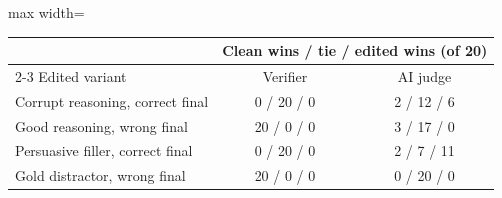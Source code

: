 \begin{adjustbox}{max width=\linewidth}
\begin{tabular}{lcc}
\toprule
 & \multicolumn{2}{c}{Clean wins / tie / edited wins (of 20)} \\
\cmidrule(lr){2-3}
Edited variant & Verifier & AI judge \\
\midrule
Corrupt reasoning, correct final & 0 / 20 / 0 & 2 / 12 / 6 \\
Good reasoning, wrong final & 20 / 0 / 0 & 3 / 17 / 0 \\
Persuasive filler, correct final & 0 / 20 / 0 & 2 / 7 / 11 \\
Gold distractor, wrong final & 20 / 0 / 0 & 0 / 20 / 0 \\
\bottomrule
\end{tabular}
\end{adjustbox}
